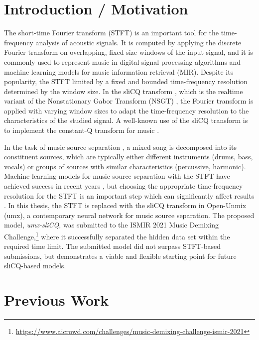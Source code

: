 \documentclass[letter,12pt]{article}
\title{\ThesisTitle}
\author{Sevag Hanssian, sevag.hanssian@mail.mcgill.ca}
\begin{document}
\maketitle

\section{Introduction / Motivation}

The short-time Fourier transform (STFT) is an important tool for the time-frequency analysis of acoustic signals. It is computed by applying the discrete Fourier transform on overlapping, fixed-size windows of the input signal, and it is commonly used to represent music in digital signal processing algorithms and machine learning models for music information retrieval (MIR). Despite its popularity, the STFT limited by a fixed and bounded time-frequency resolution determined by the window size. In the sliCQ transform \cite{invertiblecqt}, which is the realtime variant of the Nonstationary Gabor Transform (NSGT) \cite{balazs}, the Fourier transform is applied with varying window sizes to adapt the time-frequency resolution to the characteristics of the studied signal. A well-known use of the sliCQ transform is to implement the constant-Q transform for music \cite{jbrown, klapuricqt}.

In the task of music source separation \cite{musicsepgood}, a mixed song is decomposed into its constituent sources, which are typically either different instruments (drums, bass, vocals) or groups of sources with similar characteristics (percussive, harmonic). Machine learning models for music source separation with the STFT have achieved success in recent years \cite{sisec2018}, but choosing the appropriate time-frequency resolution for the STFT is an important step which can significantly affect results \cite{tftradeoff1, tftradeoff2}. In this thesis, the STFT is replaced with the sliCQ transform in Open-Unmix (umx), a contemporary neural network \cite{umx} for music source separation. The proposed model, \textit{umx-sliCQ}, was submitted to the ISMIR 2021 Music Demixing Challenge,\footnote{\url{https://www.aicrowd.com/challenges/music-demixing-challenge-ismir-2021}} where it successfully separated the hidden data set within the required time limit. The submitted model did not surpass STFT-based submissions, but demonstrates a viable and flexible starting point for future sliCQ-based models.

\section{Previous Work}
\end{document}

